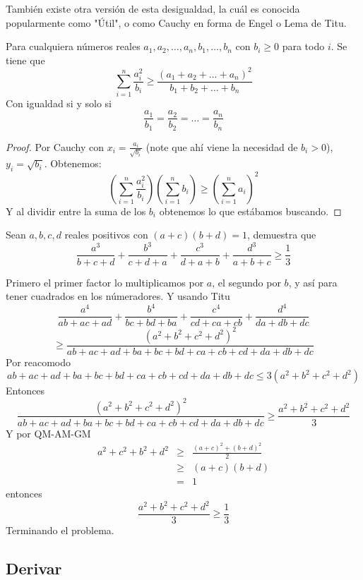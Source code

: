 \documentclass[11pt]{scrartcl}
\begin{document}
\noindent
Tambi\'en existe otra versi\'on de esta desigualdad, la cu\'al es conocida popularmente como "\'Util", o como Cauchy en forma de Engel o Lema de Titu. 
\begin{theorem} [\'Util]
    Para cualquiera n\'umeros reales $a_1,a_2,\ldots, a_n, b_1,\ldots,b_n$ con $b_i \geq 0$ para todo $i$. Se tiene que 
    \[\sum_{i=1}^n \frac{a_i^2}{b_i} \geq \frac{(a_1+a_2+\ldots+a_n)^2}{b_1+b_2+\ldots+b_n}\]
    Con igualdad si y solo si
    \[\frac{a_1}{b_1}=\frac{a_2}{b_2}=\ldots=\frac{a_n}{b_n}\]
\end{theorem}
\begin{proof}
Por Cauchy con $x_i=\frac{a_i}{\sqrt{b_i}}$ (note que ah\'i viene la necesidad de $b_i>0$), $y_i=\sqrt{b_i}$. Obtenemos:
\[\left(\sum_{i=1}^n \frac{a_i^2}{b_i}\right)\left(\sum_{i=1}^n b_i\right) \geq \left(\sum_{i=1}^n a_i\right)^2\]
Y al dividir entre la suma de los $b_i$ obtenemos lo que est\'abamos buscando.
\end{proof}
\begin{example}
    Sean $a,b,c,d$ reales positivos con $(a+c)(b+d)=1$, demuestra que
    \[\frac{a^3}{b+c+d}+\frac{b^3}{c+d+a}+\frac{c^3}{d+a+b}+\frac{d^3}{a+b+c}\geq \frac 13\]
    \label{IMOSL90-24}
\end{example}
\begin{soln}
    Primero el primer factor lo multiplicamos por $a$, el segundo por $b$, y as\'i para tener cuadrados en los n\'umeradores. Y usando Titu
    \[\frac{a^4}{ab+ac+ad}+\frac{b^4}{bc+bd+ba}+\frac{c^4}{cd+ca+cb}+\frac{d^4}{da+db+dc}\]\[\geq \frac{(a^2+b^2+c^2+d^2)^2}{ab+ac+ad+ba+bc+bd+ca+cb+cd+da+db+dc}\]
    Por reacomodo 
    \[ab+ac+ad+ba+bc+bd+ca+cb+cd+da+db+dc\leq 3(a^2+b^2+c^2+d^2)\]
    Entonces 
    \[\frac{(a^2+b^2+c^2+d^2)^2}{ab+ac+ad+ba+bc+bd+ca+cb+cd+da+db+dc} \geq \frac{a^2+b^2+c^2+d^2}{3}\]
    Y por QM-AM-GM
    \begin{eqnarray*}
        a^2+c^2+b^2+d^2 &\geq& \frac{(a+c)^2+(b+d)^2}{2} \\
        &\geq& (a+c)(b+d)\\
        &=& 1
    \end{eqnarray*}
    entonces 
    \[\frac{a^2+b^2+c^2+d^2}{3}\geq \frac 13\]
    Terminando el problema.
\end{soln}

\subsection{Derivar}


\newpage
\end{document}
